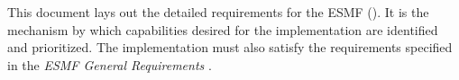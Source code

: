 %

This document lays out the detailed requirements for the  
ESMF \longname (\funcname).  It is the mechanism by which capabilities
desired for the \funcname implementation are identified and 
prioritized.  The \funcname implementation must also satisfy 
the requirements specified in the {\it ESMF General Requirements}
\cite{ESMFGenReq}.







